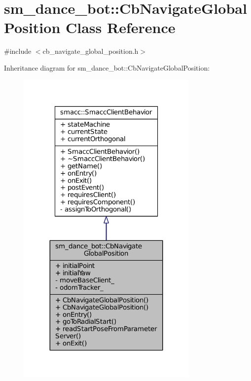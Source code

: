 \hypertarget{classsm__dance__bot_1_1CbNavigateGlobalPosition}{}\section{sm\+\_\+dance\+\_\+bot\+:\+:Cb\+Navigate\+Global\+Position Class Reference}
\label{classsm__dance__bot_1_1CbNavigateGlobalPosition}


{\ttfamily \#include $<$cb\+\_\+navigate\+\_\+global\+\_\+position.\+h$>$}



Inheritance diagram for sm\+\_\+dance\+\_\+bot\+:\+:Cb\+Navigate\+Global\+Position\+:
\nopagebreak
\begin{figure}[H]
\begin{center}
\leavevmode
\includegraphics[width=251pt]{classsm__dance__bot_1_1CbNavigateGlobalPosition__inherit__graph}
\end{center}
\end{figure}


